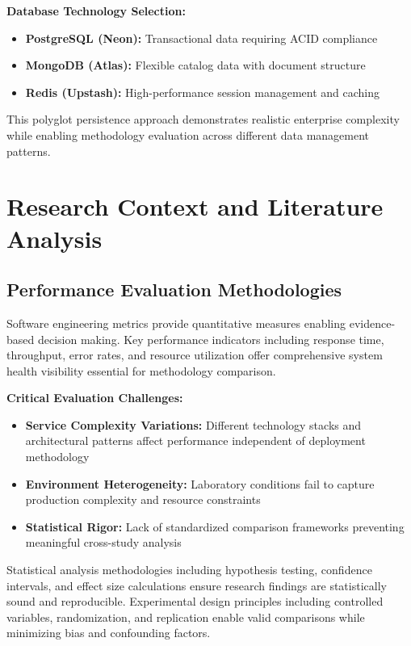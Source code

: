 \textbf{Database Technology Selection:}
\begin{itemize}
\item \textbf{PostgreSQL (Neon):} Transactional data requiring ACID compliance
\item \textbf{MongoDB (Atlas):} Flexible catalog data with document structure
\item \textbf{Redis (Upstash):} High-performance session management and caching
\end{itemize}

This polyglot persistence approach demonstrates realistic enterprise complexity while enabling methodology evaluation across different data management patterns.

\section{Research Context and Literature Analysis}

\subsection{Performance Evaluation Methodologies}

Software engineering metrics provide quantitative measures enabling evidence-based decision making. Key performance indicators including response time, throughput, error rates, and resource utilization offer comprehensive system health visibility essential for methodology comparison.

\textbf{Critical Evaluation Challenges:}
\begin{itemize}
\item \textbf{Service Complexity Variations:} Different technology stacks and architectural patterns affect performance independent of deployment methodology
\item \textbf{Environment Heterogeneity:} Laboratory conditions fail to capture production complexity and resource constraints
\item \textbf{Statistical Rigor:} Lack of standardized comparison frameworks preventing meaningful cross-study analysis
\end{itemize}

Statistical analysis methodologies including hypothesis testing, confidence intervals, and effect size calculations ensure research findings are statistically sound and reproducible. Experimental design principles including controlled variables, randomization, and replication enable valid comparisons while minimizing bias and confounding factors.

